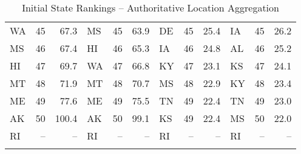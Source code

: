 \begin{longtable}{lrr|lrr||lrr|lrr}
        WA &   45 &   67.3 &            MS &   45 &  63.9 &             DE &   45 &   25.4 &            IA &   45 &   26.2 \\
        MS &   46 &   67.4 &            HI &   46 &  65.3 &             IA &   46 &   24.8 &            AL &   46 &   25.2 \\
        HI &   47 &   69.7 &            WA &   47 &  66.8 &             KY &   47 &   23.1 &            KS &   47 &   24.1 \\
        MT &   48 &   71.9 &            MT &   48 &  70.7 &             MS &   48 &   22.9 &            KY &   48 &   23.4 \\
        ME &   49 &   77.6 &            ME &   49 &  75.5 &             TN &   49 &   22.4 &            TN &   49 &   23.0 \\
        AK &   50 &  100.4 &            AK &   50 &  99.1 &             KS &   49 &   22.4 &            MS &   50 &   22.0 \\
        RI &   -- &     -- &            RI &   -- &    -- &             RI &   -- &     -- &            RI &   -- &     -- \\
        
        \caption{Initial State Rankings -- Authoritative Location Aggregation}
        \label{tab:dns_auth_initial_state_rankings}
\end{longtable}